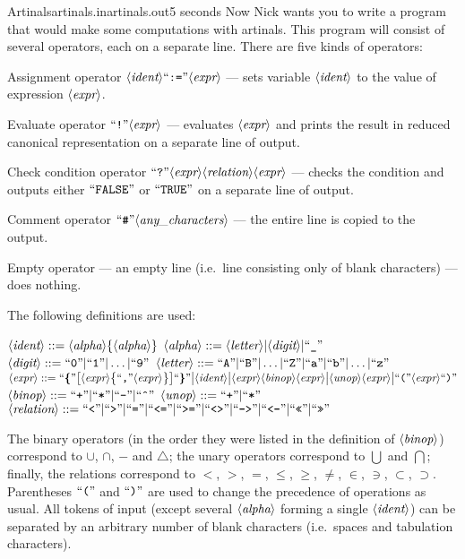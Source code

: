 \begin{problem}{Artinals}{artinals.in}{artinals.out}{5 seconds}
Now Nick wants you to write a program that would make some computations 
with artinals. This program will consist of several operators, each 
on a separate line. There are five kinds of operators:
\begin{shortitems}
\item Assignment operator $\langle\textit{ident}\rangle\text{``{\tt :=}''}\langle\textit{expr}\rangle$ --- sets variable 
$\langle\textit{ident}\rangle$ to the value of expression $\langle\textit{expr}\rangle$.
\item Evaluate operator $\text{``{\tt !}''}\langle\textit{expr}\rangle$ --- evaluates $\langle\textit{expr}\rangle$ 
and prints the result in reduced canonical representation on a 
separate line of output.

\item Check condition operator $\text{``{\tt ?}''}\langle\textit{expr}\rangle\langle\textit{relation}\rangle\langle\textit{expr}\rangle$ --- 
checks the condition and outputs either $\text{``{\tt FALSE}''}$ or $\text{``{\tt TRUE}''}$ 
on a separate line of output.
\item Comment operator $\text{``{\tt \#}''}\langle\textit{any\_characters}\rangle$ --- the entire line 
is copied to the output.
\item Empty operator --- an empty line (i.e.\ line consisting only of 
blank characters) --- does nothing.
\end{shortitems}

The following definitions are used:

{\obeylines\parindent=6mm\parskip=0mm
$\langle\textit{ident}\rangle ::= \langle\textit{alpha}\rangle \{\langle\textit{alpha}\rangle\}$
$\langle\textit{alpha}\rangle ::= \langle\textit{letter}\rangle | \langle\textit{digit}\rangle | \text{``{\tt \_}''}$
$\langle\textit{digit}\rangle ::= \text{``{\tt 0}''}|\text{``{\tt 1}''}|\ldots|\text{``{\tt 9}''}$
$\langle\textit{letter}\rangle ::= \text{``{\tt A}''}|\text{``{\tt B}''}|\ldots|\text{``{\tt Z}''}|\text{``{\tt a}''}|\text{``{\tt b}''}|\ldots|\text{``{\tt z}''}$
$\tq{expr} ::= \qb\{\bigl[\tq{expr}\bigl\{\qq,\tq{expr}\bigr\}\bigr]%
\qb\} \big| \tq{ident} \big| \tq{expr}\tq{binop}\tq{expr} \big| %
\tq{unop}\tq{expr} \big| \qq(\tq{expr}\qq)$
$\langle\textit{binop}\rangle ::= \text{``{\tt +}''} | \text{``{\tt *}''} | \text{``{\tt -}''} | \text{``{\tt \^{}}''}$
$\langle\textit{unop}\rangle ::= \text{``{\tt +}''} | \text{``{\tt *}''}$
$\tq{relation} ::= \qq{<} | \qq{>} | \qq{=} | \qq{<=} | \qq{>=} | \qq{<>} | %
\qq{->} | \qq{<-} | \qq{<<} | \qq{>>}$
}

The binary operators (in the order they were listed in the definition 
of $\langle\textit{binop}\rangle$) correspond to $\cup$, $\cap$, $-$ and $\triangle$; 
the unary operators correspond to $\bigcup$ and $\bigcap$; finally, 
the relations correspond to $<$, $>$, $=$, $\leq$, $\geq$, $\neq$, 
$\in$, $\ni$, $\subset$, $\supset$. Parentheses $\text{``{\tt (}''}$ and $\text{``{\tt )}''}$ are 
used to change the precedence of operations as usual. All tokens of 
input (except several $\langle\textit{alpha}\rangle$ forming a single $\langle\textit{ident}\rangle$)  
can be separated by an arbitrary number of blank characters (i.e.\ spaces 
and tabulation characters).


\end{problem}
